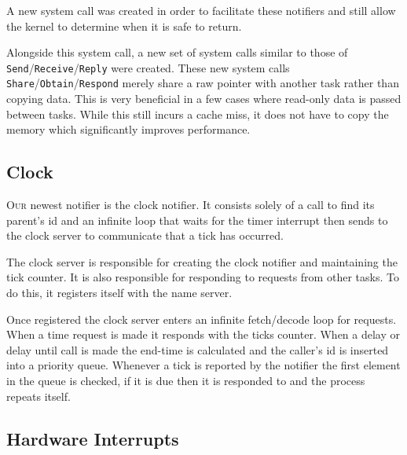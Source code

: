 \documentclass{article}
\begin{document}
A new system call was created in order to facilitate these notifiers and still
allow the kernel to determine when it is safe to return.

Alongside this system call, a new set of system calls similar to those of
\texttt{Send}/\texttt{Receive}/\texttt{Reply} were created. These new system
calls \texttt{Share}/\texttt{Obtain}/\texttt{Respond} merely share a raw pointer
with another task rather than copying data. This is very beneficial in a few
cases where read-only data is passed between tasks. While this still incurs a
cache miss, it does not have to copy the memory which significantly improves
performance.

\subsection*{Clock}

\textsc{Our} newest notifier is the clock notifier. It consists solely of a call to find
its parent's id and an infinite loop that waits for the timer interrupt then
sends to the clock server to communicate that a tick has occurred.

The clock server is responsible for creating the clock notifier and maintaining
the tick counter. It is also responsible for responding to requests from other
tasks. To do this, it registers itself with the name server.

Once registered the clock server enters an infinite fetch/decode loop for
requests. When a time request is made it responds with the ticks counter. When a
delay or delay until call is made the end-time is calculated and the caller's id
is inserted into a priority queue. Whenever a tick is reported by the notifier
the first element in the queue is checked, if it is due then it is responded to
and the process repeats itself.

\subsection*{Hardware Interrupts}
\end{document}
